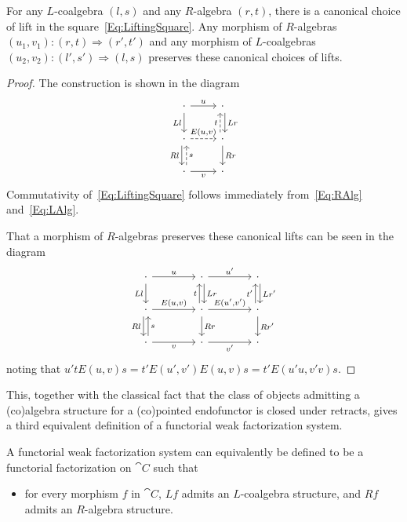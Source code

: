 \begin{lemma}
	For any $L$-coalgebra $(l,s)$ and any $R$-algebra $(r,t)$, there is a canonical choice of lift in the square~\eqref{Eq:LiftingSquare}. Any morphism of $R$-algebras $(u_1,v_1)\colon (r,t)\Rightarrow (r',t')$ and any morphism of $L$-coalgebras $(u_2,v_2)\colon (l',s')\Rightarrow (l,s)$ preserves these canonical choices of lifts.
\end{lemma}
\begin{proof}
	The construction is shown in the diagram
	\begin{equation}\label{Eq:CanonicalLift}
	\begin{tikzcd}
		\cdot 	\rar{u} 
				\dar[swap]{Ll} 
			& \cdot \dar[xshift=0.5ex]{Lr} \\
		\cdot 	\rar[dashed]{E(u,v)} 
				\dar[xshift=-0.5ex][swap]{Rl} 
			& \cdot \uar[xshift=-0.5ex,dashed]{t} 
				\dar{Rr} \\
		\cdot 	\uar[xshift=0.5ex,dashed][swap]{s}
				\rar[swap]{v}
			& \cdot
	\end{tikzcd}
	\end{equation}
	Commutativity of~\eqref{Eq:LiftingSquare} follows immediately from~\eqref{Eq:RAlg} and~\eqref{Eq:LAlg}.

	That a morphism of $R$-algebras preserves these canonical lifts can be seen in the diagram
	\[
	\begin{tikzcd}[column sep=4em]
		\cdot 	\rar{u} 
				\dar[swap]{Ll} 
			& \cdot \rar{u'}
				\dar[xshift=0.5ex]{Lr} 
			& \cdot \dar[xshift=0.5ex]{Lr'} \\
		\cdot 	\rar{E(u,v)} 
				\dar[xshift=-0.5ex][swap]{Rl} 
			& \cdot \rar{E(u',v')} 
				\uar[xshift=-0.5ex]{t} 
				\dar{Rr} 
			& \cdot \uar[xshift=-0.5ex]{t'} 
				\dar{Rr'} \\
		\cdot 	\uar[xshift=0.5ex][swap]{s}
				\rar[swap]{v}
			& \cdot \rar[swap]{v'}
			& \cdot
	\end{tikzcd}
	\]
	noting that $u'tE(u,v)s = t'E(u',v')E(u,v)s = t'E(u'u,v'v)s$.
\end{proof}

This, together with the classical fact that the class of objects admitting a (co)algebra structure for a (co)pointed endofunctor is closed under retracts, gives a third equivalent definition of a functorial weak factorization system.

\begin{lemma}
	A functorial weak factorization system can equivalently be defined to be a functorial factorization on $\cat{C}$ such that
	\begin{itemize}
		\item for every morphism $f$ in $\cat{C}$, $Lf$ admits an $L$-coalgebra structure, and $Rf$ admits an $R$-algebra structure.
	\end{itemize}
\end{lemma}

